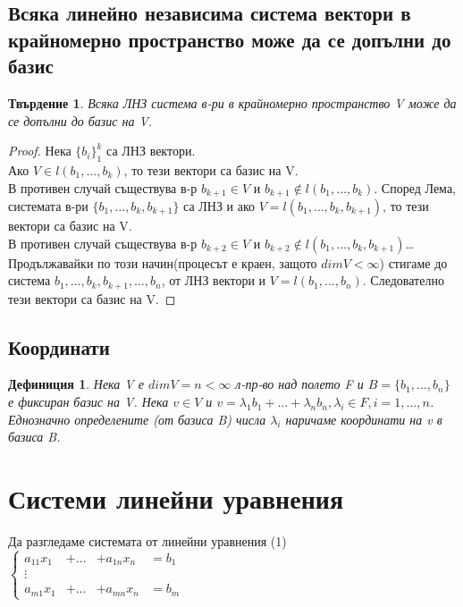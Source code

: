 \documentclass[fleqn,12pt]{article}
\newtheorem*{Def}{Дефиниция}
\newtheorem*{Claim}{Твърдение}
\begin{document}
\begin{justify}
\subsection{Всяка линейно независима система вектори в крайномерно пространство може да се допълни до
базис}
\begin{Claim}
    Всяка ЛНЗ система в-ри в крайномерно пространство V може да се допълни до базис на V.
\end{Claim}
\begin{proof}
    Нека $\{b_i\}_1^k$ са ЛНЗ вектори.\\
    Ако $V \in l(b_1,\dots,b_k)$, то тези вектори са базис на V.\\
    В противен случай съществува в-р $b_{k+1} \in V$ и $b_{k+1} \notin l(b_1,\dots,b_k)$. Според Лема,
    системата в-ри $\{b_1,\dots,b_k,b_{k+1}\}$ са ЛНЗ и ако $V=l(b_1,\dots,b_k,b_{k+1})$, то тези
    вектори са базис на V.\\
    В противен случай съществува в-р $b_{k+2} \in V$ и $b_{k+2} \notin l(b_1,\dots,b_k,b_{k+1})$\dots\\
    Продължавайки по този начин(процесът е краен, защото $dimV < \infty$) стигаме до система
    $b_1,\dots,b_k,b_{k+1},\dots,b_n$, от ЛНЗ вектори и $V=l(b_1,\dots,b_n)$. Следователно тези вектори са
    базис на V.
\end{proof}

\subsection{Координати}
\begin{Def}
    Нека V е $dimV=n < \infty$ л-пр-во над полето F и $B=\{b_1,\dots,b_n\}$ е фиксиран базис на V. Нека 
    $v\in V$ и $v=\lambda_1 b_1 + \dots + \lambda_n b_n, \lambda_i \in F, i=1,\dots,n$. Еднозначно
    определените (от базиса B) числа $\lambda_i$ наричаме координати на v в базиса B.
\end{Def}

\section{Системи линейни уравнения}
Да разгледаме системата от линейни уравнения (1)
\begin{math}
    \left\{
    \begin{aligned}
        a_{11} x_1 &+ \dots &+ a_{1n} x_n &= b_1 \\
        \vdots  \\
        a_{m1} x_1 &+ \dots &+ a_{mn} x_n &= b_m
    \end{aligned}
    \right.
\end{math}


\end{justify}
\end{document}

